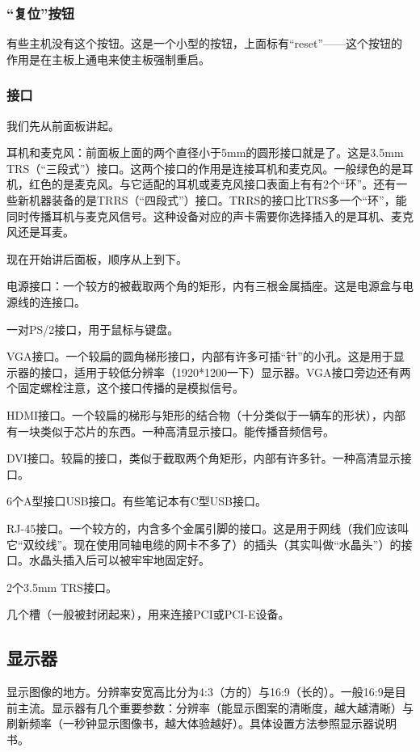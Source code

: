 \subsubsection{“复位”按钮}
有些主机没有这个按钮。这是一个小型的按钮，上面标有“reset”——这个按钮的作用是在主板上通电来使主板强制重启。{\color{red}{警告！不要尝试使用这种方法关闭计算机——这有可能导致严重的数据丢失！}}
\subsubsection{接口}
我们先从前面板讲起。\par
耳机和麦克风：前面板上面的两个直径小于5mm的圆形接口就是了。这是3.5mm TRS（“三段式”）接口。这两个接口的作用是连接耳机和麦克风。一般绿色的是耳机，红色的是麦克风。与它适配的耳机或麦克风接口表面上有有2个“环”。还有一些新机器装备的是TRRS（“四段式”）接口。TRRS的接口比TRS多一个“环”，能同时传播耳机与麦克风信号。这种设备对应的声卡需要你选择插入的是耳机、麦克风还是耳麦。\par
现在开始讲后面板，顺序从上到下。\par
电源接口：一个较方的被截取两个角的矩形，内有三根金属插座。这是电源盒与电源线的连接口。\par
一对PS/2接口，用于鼠标与键盘。\par
VGA接口。一个较扁的圆角梯形接口，内部有许多可插“针”的小孔。这是用于显示器的接口，适用于较低分辨率（1920*1200一下）显示器。VGA接口旁边还有两个固定螺栓注意，这个接口传播的是模拟信号。\par
HDMI接口。一个较扁的梯形与矩形的结合物（十分类似于一辆车的形状），内部有一块类似于芯片的东西。一种高清显示接口。能传播音频信号。\par
DVI接口。较扁的接口，类似于截取两个角矩形，内部有许多针。一种高清显示接口。\par
6个A型接口USB接口。有些笔记本有C型USB接口。\par
RJ-45接口。一个较方的，内含多个金属引脚的接口。这是用于网线（我们应该叫它“双绞线”。现在使用同轴电缆的网卡不多了）的插头（其实叫做“水晶头”）的接口。水晶头插入后可以被牢牢地固定好。\par
2个3.5mm TRS接口。\par
几个槽（一般被封闭起来），用来连接PCI或PCI-E设备。
\subsection{显示器}
显示图像的地方。分辨率安宽高比分为4:3（方的）与16:9（长的）。一般16:9是目前主流。显示器有几个重要参数：分辨率（能显示图案的清晰度，越大越清晰）与刷新频率（一秒钟显示图像书，越大体验越好）。具体设置方法参照显示器说明书。
